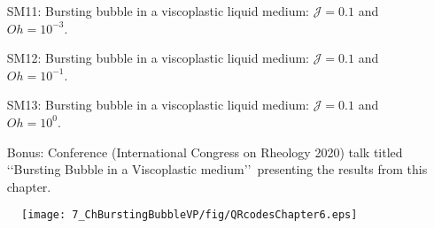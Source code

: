 \begin{subappendices}
\begin{enumerate}
	\item[SM11:] Bursting bubble in a viscoplastic liquid medium: $\mathcal{J} = 0.1$ and $Oh = 10^{-3}$. 
	\item[SM12:] Bursting bubble in a viscoplastic liquid medium: $\mathcal{J} = 0.1$ and $Oh = 10^{-1}$. 
	\item[SM13:] Bursting bubble in a viscoplastic liquid medium: $\mathcal{J} = 0.1$ and $Oh = 10^{0}$. 
	\item[Bonus:] Conference (International Congress on Rheology 2020) talk titled \lq\lq Bursting Bubble in a Viscoplastic medium\rq\rq\, presenting the results from this chapter. 
\end{enumerate}

\begin{figure*}
	\centering
	\texttt{[image: 7\_ChBurstingBubbleVP/fig/QRcodesChapter6.eps]}
\end{figure*}

\end{subappendices}